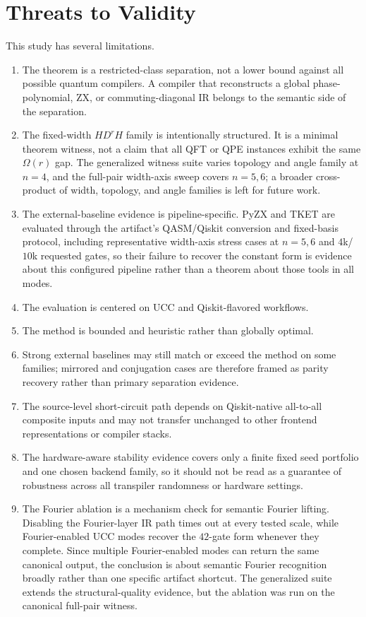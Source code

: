 \documentclass[11pt]{article}
\begin{document}
\section{Threats to Validity}
\label{sec:threats}

This study has several limitations.
\begin{enumerate}[leftmargin=1.5em]
    \item The theorem is a restricted-class separation, not a lower bound against all possible quantum compilers. A compiler that reconstructs a global phase-polynomial, ZX, or commuting-diagonal IR belongs to the semantic side of the separation.
    \item The fixed-width $H D^r H$ family is intentionally structured. It is a minimal theorem witness, not a claim that all QFT or QPE instances exhibit the same $\Omega(r)$ gap. The generalized witness suite varies topology and angle family at $n=4$, and the full-pair width-axis sweep covers $n=5,6$; a broader cross-product of width, topology, and angle families is left for future work.
    \item The external-baseline evidence is pipeline-specific. PyZX and TKET are evaluated through the artifact's QASM/Qiskit conversion and fixed-basis protocol, including representative width-axis stress cases at $n=5,6$ and $4$k/$10$k requested gates, so their failure to recover the constant form is evidence about this configured pipeline rather than a theorem about those tools in all modes.
    \item The evaluation is centered on UCC and Qiskit-flavored workflows.
    \item The method is bounded and heuristic rather than globally optimal.
    \item Strong external baselines may still match or exceed the method on some families; mirrored and conjugation cases are therefore framed as parity recovery rather than primary separation evidence.
    \item The source-level short-circuit path depends on Qiskit-native all-to-all composite inputs and may not transfer unchanged to other frontend representations or compiler stacks.
    \item The hardware-aware stability evidence covers only a finite fixed seed portfolio and one chosen backend family, so it should not be read as a guarantee of robustness across all transpiler randomness or hardware settings.
    \item The Fourier ablation is a mechanism check for semantic Fourier lifting. Disabling the Fourier-layer IR path times out at every tested scale, while Fourier-enabled UCC modes recover the $42$-gate form whenever they complete. Since multiple Fourier-enabled modes can return the same canonical output, the conclusion is about semantic Fourier recognition broadly rather than one specific artifact shortcut. The generalized suite extends the structural-quality evidence, but the ablation was run on the canonical full-pair witness.

\end{enumerate}
\end{document}
